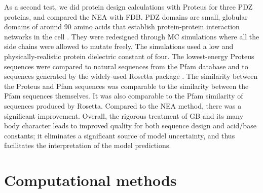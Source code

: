 \documentclass[a4paper,12pt]{article}
\begin{document}
As a second test, we did protein design calculations with Proteus for three PDZ proteins, and compared the NEA with FDB.
PDZ domains are small, globular domains of around 90 amino acids that establish protein-protein interaction networks in the
cell \cite{Harris01,Hung02,Tonikian08,Gfeller11,Subbaiah11,Sheperd11r}. They were redesigned through MC simulations where
all the side chains were allowed to mutate freely. The simulations used a low and physically-realistic protein dielectric
constant of four. The lowest-energy Proteus sequences were compared to natural sequences from the Pfam database and to
sequences generated by the widely-used Rosetta package \cite{Kuhlman00,Dantas03,Rohl04,Baker06b}. The similarity between
the Proteus and Pfam sequences was comparable to the similarity between the Pfam sequences themselves. It was also
comparable to the Pfam similarity of sequences produced by Rosetta. Compared to the NEA method, there was a significant
improvement. Overall, the rigorous treatment of GB and its many body character leads to improved quality for both sequence
design and acid/base constants; it eliminates a significant source of model uncertainty, and thus facilitates the
interpretation of the model predictions.

\section{Computational methods}
\end{document}
